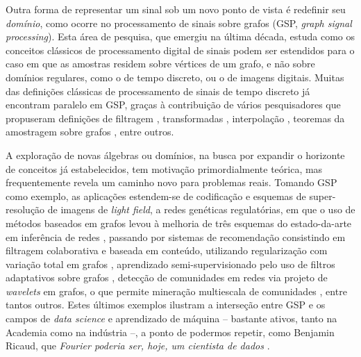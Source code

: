 Outra forma de representar um sinal sob um novo ponto de vista \'e redefinir seu \emph{dom\'inio}, como ocorre no {processamento de sinais sobre grafos} (GSP, \emph{graph signal processing}). Esta \'area de pesquisa, que emergiu na \'ultima d\'ecada, estuda como os conceitos cl\'assicos de processamento digital de sinais podem ser estendidos para o caso em que as amostras residem sobre v\'ertices de um grafo, e n\~ao sobre dom\'inios regulares, como o de tempo discreto, ou o de imagens digitais. Muitas das defini\c c\~oes cl\'assicas de processamento de sinais de tempo discreto j\'a encontram paralelo em GSP, gra\c cas \`a contribui\c c\~ao de v\'arios pesquisadores que propuseram defini\c c\~oes de filtragem \cite{sandryhaila2013filters}, transformadas \cite{sandryhaila2013gft,sardellitti2017graph}, interpola\c c\~ao \cite{segarra2015interpolation}, teoremas da amostragem sobre grafos \cite{wang2015generalized,chen2016signal,tsitsvero2016signals}, entre outros.

A explora\c c\~ao de novas \'algebras ou dom\'inios, na busca por expandir o horizonte de conceitos j\'a estabelecidos, tem motiva\c c\~ao primordialmente te\'orica, mas frequentemente revela um caminho novo para problemas reais. Tomando GSP como exemplo, as aplica\c c\~oes estendem-se de codifica\c c\~ao \cite{su2017graph} e esquemas de super-resolu\c c\~ao \cite{rossi2017graph} de imagens de \emph{light field}, a redes gen\'eticas regulat\'orias, em que o uso de m\'etodos baseados em grafos levou \`a melhoria de tr\^es esquemas do estado-da-arte em infer\^encia de redes  \cite{pirayre2015brane,pirayre2017brane}, passando por sistemas de recomenda\c c\~ao consistindo em filtragem colaborativa e baseada em conte\'udo, utilizando regulariza\c c\~ao com varia\c c\~ao total em grafos \cite{benzi2016song}, aprendizado semi-supervisionado pelo uso de filtros adaptativos sobre grafos \cite{chen2014semi}, detec\c c\~ao de comunidades em redes via projeto de \emph{wavelets} em grafos, o que permite minera\c c\~ao multiescala de comunidades \cite{tremblay2014graph}, entre tantos outros. Estes \'ultimos exemplos ilustram a interse\c c\~ao entre GSP e os campos de \emph{data science} e aprendizado de m\'aquina -- bastante ativos, tanto na Academia como na ind\'ustria --, a ponto de podermos repetir, como Benjamin Ricaud, que \emph{Fourier poderia ser, hoje, um cientista de dados} \cite{ricaud2019fourier}.

